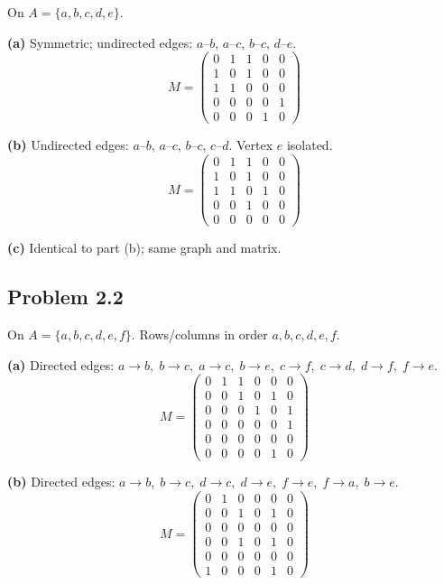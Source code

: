On $A=\{a,b,c,d,e\}$.

\textbf{(a)} Symmetric; undirected edges: $a$--$b$, $a$--$c$, $b$--$c$, $d$--$e$.
\[
  M = \begin{pmatrix}
  0&1&1&0&0\\1&0&1&0&0\\1&1&0&0&0\\0&0&0&0&1\\0&0&0&1&0
  \end{pmatrix}
\]

\textbf{(b)} Undirected edges: $a$--$b$, $a$--$c$, $b$--$c$, $c$--$d$. Vertex $e$ isolated.
\[
  M = \begin{pmatrix}
  0&1&1&0&0\\1&0&1&0&0\\1&1&0&1&0\\0&0&1&0&0\\0&0&0&0&0
  \end{pmatrix}
\]

\textbf{(c)} Identical to part (b); same graph and matrix.


\subsection*{Problem 2.2}

On $A=\{a,b,c,d,e,f\}$.  Rows/columns in order $a,b,c,d,e,f$.

\textbf{(a)} Directed edges: $a\!\to\!b,\; b\!\to\!c,\; a\!\to\!c,\; b\!\to\!e,\; c\!\to\!f,\; c\!\to\!d,\; d\!\to\!f,\; f\!\to\!e$.
\[
  M = \begin{pmatrix}
  0&1&1&0&0&0\\0&0&1&0&1&0\\0&0&0&1&0&1\\0&0&0&0&0&1\\0&0&0&0&0&0\\0&0&0&0&1&0
  \end{pmatrix}
\]

\textbf{(b)} Directed edges: $a\!\to\!b,\; b\!\to\!c,\; d\!\to\!c,\; d\!\to\!e,\; f\!\to\!e,\; f\!\to\!a,\; b\!\to\!e$.
\[
  M = \begin{pmatrix}
  0&1&0&0&0&0\\0&0&1&0&1&0\\0&0&0&0&0&0\\0&0&1&0&1&0\\0&0&0&0&0&0\\1&0&0&0&1&0
  \end{pmatrix}
\]

